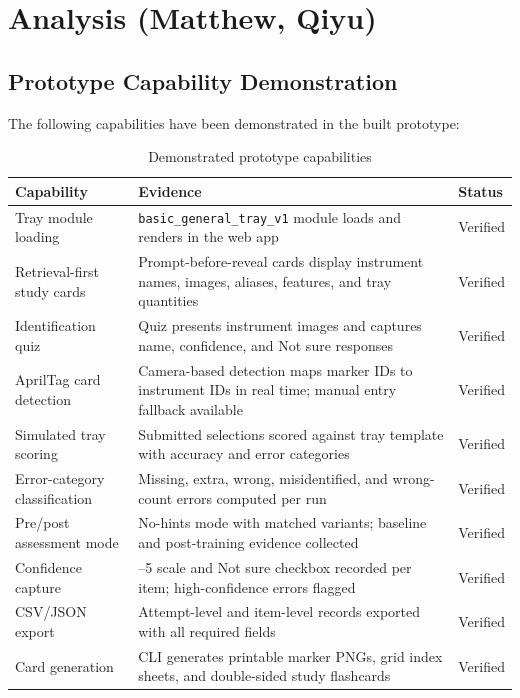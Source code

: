 \documentclass[10pt,a4paper]{article}
\begin{document}

\section{Analysis \hfill {\normalfont\small (Matthew, Qiyu)}}
\label{sec:analysis}



\subsection{Prototype Capability Demonstration}
\label{sec:prototype-capability-demonstration}

The following capabilities have been demonstrated in the built prototype:

\begin{table}[H]
\centering
\caption{Demonstrated prototype capabilities}
\label{tab:demonstrated-prototype-capabilities}
\small\renewcommand{\arraystretch}{1.2}\setlength{\tabcolsep}{4pt}
\begin{tabularx}{\textwidth}{|>{\raggedright\arraybackslash}X|>{\raggedright\arraybackslash}X|>{\raggedright\arraybackslash}X|}
\hline
Capability & Evidence & Status \\
\hline
Tray module loading & \texttt{basic\_general\_tray\_v1} module loads and renders in the web app & Verified \\
\hline
Retrieval-first study cards & Prompt-before-reveal cards display instrument names, images, aliases, features, and tray quantities & Verified \\
\hline
Identification quiz & Quiz presents instrument images and captures name, confidence, and Not sure responses & Verified \\
\hline
AprilTag card detection & Camera-based detection maps marker IDs to instrument IDs in real time; manual entry fallback available & Verified \\
\hline
Simulated tray scoring & Submitted selections scored against tray template with accuracy and error categories & Verified \\
\hline
Error-category classification & Missing, extra, wrong, misidentified, and wrong-count errors computed per run & Verified \\
\hline
Pre/post assessment mode & No-hints mode with matched variants; baseline and post-training evidence collected & Verified \\
\hline
Confidence capture & 1--5 scale and Not sure checkbox recorded per item; high-confidence errors flagged & Verified \\
\hline
CSV/JSON export & Attempt-level and item-level records exported with all required fields & Verified \\
\hline
Card generation & CLI generates printable marker PNGs, grid index sheets, and double-sided study flashcards & Verified \\
\hline
\end{tabularx}
\end{table}
\end{document}
